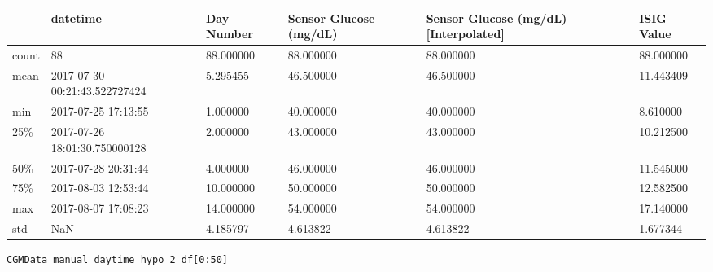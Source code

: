 \bigskip\noindent
\begin{tabular}{p{}p{}p{}p{}p{}p{}}
\toprule
 & datetime & Day Number & Sensor Glucose (mg/dL) & Sensor Glucose (mg/dL) [Interpolated] & ISIG Value \\
\hline
count & 88 & 88.000000 & 88.000000 & 88.000000 & 88.000000 \\
\hline
mean & 2017-07-30 00:21:43.522727424 & 5.295455 & 46.500000 & 46.500000 & 11.443409 \\
\hline
min & 2017-07-25 17:13:55 & 1.000000 & 40.000000 & 40.000000 & 8.610000 \\
\hline
25\% & 2017-07-26 18:01:30.750000128 & 2.000000 & 43.000000 & 43.000000 & 10.212500 \\
\hline
50\% & 2017-07-28 20:31:44 & 4.000000 & 46.000000 & 46.000000 & 11.545000 \\
\hline
75\% & 2017-08-03 12:53:44 & 10.000000 & 50.000000 & 50.000000 & 12.582500 \\
\hline
max & 2017-08-07 17:08:23 & 14.000000 & 54.000000 & 54.000000 & 17.140000 \\
\hline
std & NaN & 4.185797 & 4.613822 & 4.613822 & 1.677344 \\
\hline
\bottomrule
\end{tabular}

\bigskip

\begin{verbatim}
CGMData_manual_daytime_hypo_2_df[0:50]
\end{verbatim}

